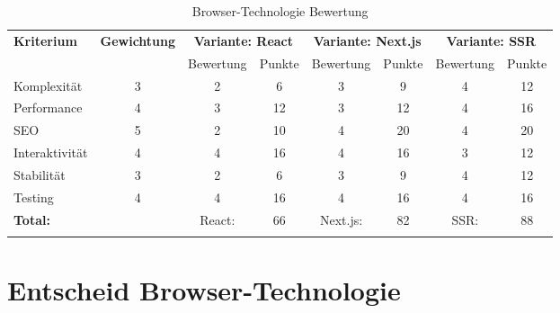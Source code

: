 \begin{longtable}[]{@{}p{2cm}ccccccc@{}}
  \toprule
  \textbf{Kriterium} & \textbf{Gewichtung} & \multicolumn{2}{c}{\textbf{Variante: React}} & \multicolumn{2}{c}{\textbf{Variante: Next.js}} & \multicolumn{2}{c}{\textbf{Variante: SSR}}\tabularnewline
                     &                     & Bewertung                                    & Punkte                                         & Bewertung                                                 & Punkte & Bewertung & Punkte \tabularnewline
  \midrule
  \endhead
  Komplexität        & 3                   & 2                                            & 6                                              & 3                                                         & 9      & 4         & 12 \tabularnewline
  Performance        & 4                   & 3                                            & 12                                             & 3                                                         & 12     & 4         & 16 \tabularnewline
  SEO                & 5                   & 2                                            & 10                                             & 4                                                         & 20     & 4         & 20 \tabularnewline
  Interaktivität     & 4                   & 4                                            & 16                                             & 4                                                         & 16     & 3         & 12 \tabularnewline
  Stabilität         & 3                   & 2                                            & 6                                              & 3                                                         & 9      & 4         & 12 \tabularnewline
  Testing            & 4                   & 4                                            & 16                                             & 4                                                         & 16     & 4         & 16 \tabularnewline
  \midrule
  \textbf{Total:}    &                     & React:                                       & 66                                             & Next.js:                                                  & 82     & SSR:      & 88 \tabularnewline
  \bottomrule
  \caption{Browser-Technologie Bewertung}
\end{longtable}

\section{Entscheid Browser-Technologie}\label{entscheid-browser-technologie}


